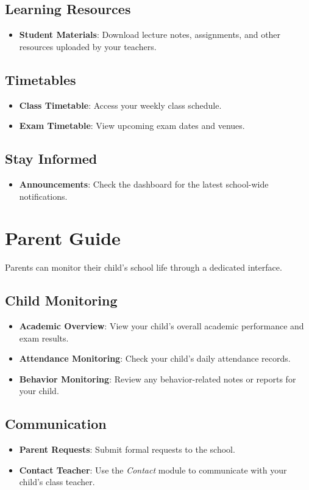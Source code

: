 \documentclass[12pt, a4paper]{report}
\begin{document}
\section{Learning Resources}
\begin{itemize}
    \item \textbf{Student Materials}: Download lecture notes, assignments, and other resources uploaded by your teachers.
\end{itemize}

\section{Timetables}
\begin{itemize}
    \item \textbf{Class Timetable}: Access your weekly class schedule.
    \item \textbf{Exam Timetable}: View upcoming exam dates and venues.
\end{itemize}

\section{Stay Informed}
\begin{itemize}
    \item \textbf{Announcements}: Check the dashboard for the latest school-wide notifications.
\end{itemize}

\chapter{Parent Guide}
Parents can monitor their child's school life through a dedicated interface.

\section{Child Monitoring}
\begin{itemize}
    \item \textbf{Academic Overview}: View your child's overall academic performance and exam results.
    \item \textbf{Attendance Monitoring}: Check your child's daily attendance records.
    \item \textbf{Behavior Monitoring}: Review any behavior-related notes or reports for your child.
\end{itemize}

\section{Communication}
\begin{itemize}
    \item \textbf{Parent Requests}: Submit formal requests to the school.
    \item \textbf{Contact Teacher}: Use the \textit{Contact} module to communicate with your child's class teacher.
\end{itemize}
\end{document}
